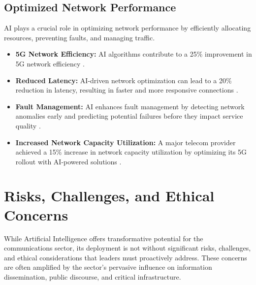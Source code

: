 \subsection{Optimized Network Performance}
AI plays a crucial role in optimizing network performance by efficiently allocating resources, preventing faults, and managing traffic.
\begin{itemize}
    \item \textbf{5G Network Efficiency:} AI algorithms contribute to a 25\% improvement in 5G network efficiency \cite{Veritis_Benefits}.
    \item \textbf{Reduced Latency:} AI-driven network optimization can lead to a 20\% reduction in latency, resulting in faster and more responsive connections \cite{Veritis_Benefits}.
    \item \textbf{Fault Management:} AI enhances fault management by detecting network anomalies early and predicting potential failures before they impact service quality \cite{ResearchGate_NetworkPerf, Infosys_NetworkPerf}.
    \item \textbf{Increased Network Capacity Utilization:} A major telecom provider achieved a 15\% increase in network capacity utilization by optimizing its 5G rollout with AI-powered solutions \cite{Processica_Benefits}.
\end{itemize}

\section{Risks, Challenges, and Ethical Concerns}

While Artificial Intelligence offers transformative potential for the communications sector, its deployment is not without significant risks, challenges, and ethical considerations that leaders must proactively address. These concerns are often amplified by the sector's pervasive influence on information dissemination, public discourse, and critical infrastructure.


